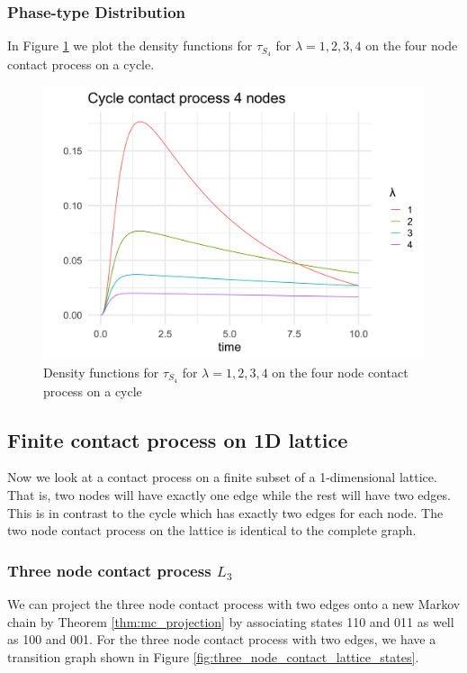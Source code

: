 \documentclass{article}
\theoremstyle{plain}
\theoremstyle{definition}
\theoremstyle{remark}
\numberwithin{equation}{section}
\begin{document}
\subsubsection{Phase-type Distribution}

In Figure \ref{fig:contact_4_cycle_phase_densities} we plot the density functions for $\tau_{S_4}$ for $\lambda = 1, 2, 3, 4$ on the four node contact process on a cycle.

\begin{figure}[H]
  \centering
    \includegraphics[width=.80\textwidth]{figures/cycle_4_contact_phase_densities.png}
   \caption{Density functions for $\tau_{S_4}$ for $\lambda = 1, 2, 3, 4$ on the four node contact process on a cycle}
  \label{fig:contact_4_cycle_phase_densities}
\end{figure}

\subsection{Finite contact process on 1D lattice}

Now we look at a contact process on a finite subset of a 1-dimensional lattice.
That is, two nodes will have exactly one edge while the rest will have two edges.
This is in contrast to the cycle which has exactly two edges for each node.
The two node contact process on the lattice is identical to the complete graph.

\subsubsection{Three node contact process \texorpdfstring{$L_3$}{L3}}
We can project the three node contact process with two edges onto a new Markov chain by Theorem \ref{thm:mc_projection} by associating states 110 and 011 as well as 100 and 001.
For the three node contact process with two edges, we have a transition graph shown in Figure \ref{fig:three_node_contact_lattice_states}.
\end{document}
